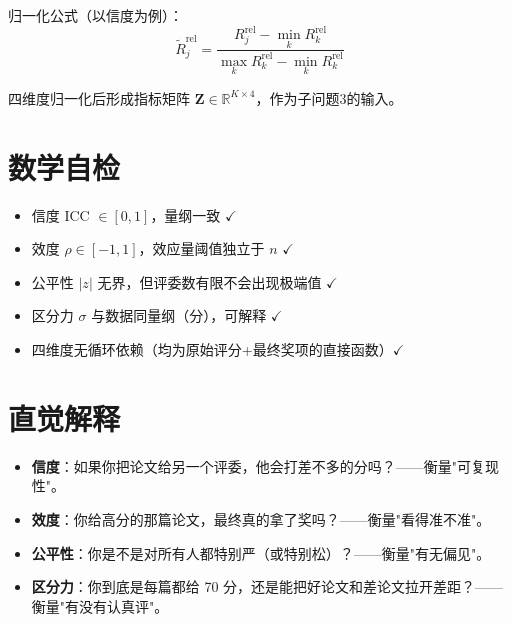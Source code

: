 \documentclass[UTF8]{ctexart}
\begin{document}
归一化公式（以信度为例）：
\begin{equation}
\tilde{R}_j^{\text{rel}} = \frac{R_j^{\text{rel}} - \min_k R_k^{\text{rel}}}{\max_k R_k^{\text{rel}} - \min_k R_k^{\text{rel}}}
\end{equation}

四维度归一化后形成指标矩阵 $\mathbf{Z} \in \mathbb{R}^{K \times 4}$，作为子问题3的输入。

\section{数学自检}

\begin{itemize}
    \item 信度 ICC $\in [0,1]$，量纲一致 $\checkmark$
    \item 效度 $\rho \in [-1,1]$，效应量阈值独立于 $n$ $\checkmark$
    \item 公平性 $|z|$ 无界，但评委数有限不会出现极端值 $\checkmark$
    \item 区分力 $\sigma$ 与数据同量纲（分），可解释 $\checkmark$
    \item 四维度无循环依赖（均为原始评分+最终奖项的直接函数）$\checkmark$
\end{itemize}

\section{直觉解释}

\begin{itemize}
    \item \textbf{信度}：如果你把论文给另一个评委，他会打差不多的分吗？——衡量"可复现性"。
    \item \textbf{效度}：你给高分的那篇论文，最终真的拿了奖吗？——衡量"看得准不准"。
    \item \textbf{公平性}：你是不是对所有人都特别严（或特别松）？——衡量"有无偏见"。
    \item \textbf{区分力}：你到底是每篇都给 70 分，还是能把好论文和差论文拉开差距？——衡量"有没有认真评"。
\end{itemize}
\end{document}
